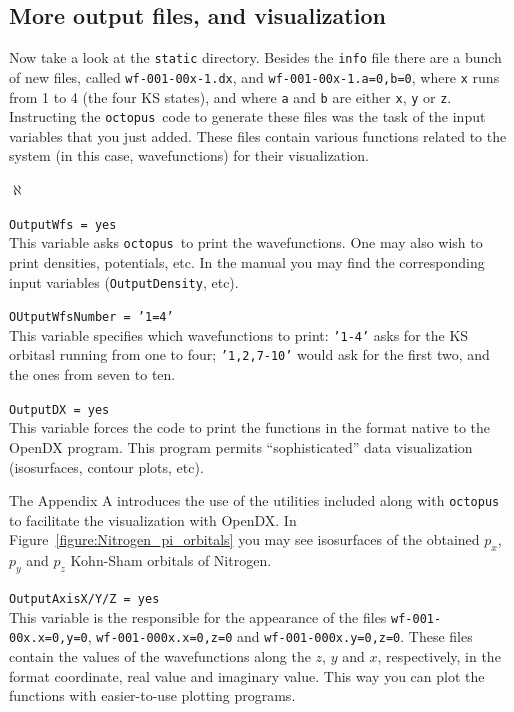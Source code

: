 \documentclass[10pt,a4paper,twoside]{article}
\newcommand{\octopus}{{\tt octopus}\ }
\newenvironment{mylist}
{
\begin{list}{$\aleph$}
{
\setlength{\parskip}{0pt}
\setlength{\topsep}{0pt}
\setlength{\partopsep}{0pt}
\setlength{\itemsep}{0pt}
\setlength{\parsep}{0pt}
}
}
{
\end{list}
}
\begin{document}
\subsection{More output files, and visualization}
Now take a look at the {\tt static} directory. Besides the {\tt info}
file there are a bunch of new files, called {\tt wf-001-00x-1.dx},
and {\tt wf-001-00x-1.a=0,b=0}, where {\tt x} runs from 1 to 4 (the four
KS states), and where {\tt a} and {\tt b} are either {\tt x}, {\tt y} or {\tt z}.
Instructing the \octopus code to generate these files
was the task of the input variables that you just added.
These files contain various functions related to the system (in this
case, wavefunctions) for their visualization.
\begin{mylist}
\item {\tt OutputWfs = yes}\\
This variable asks \octopus to print the wavefunctions. One may also wish
to print densities, potentials, etc. In the manual you may find the corresponding
input variables ({\tt OutputDensity}, etc).
\item {\tt OUtputWfsNumber = '1=4'}\\
This variable specifies which wavefunctions to print: {\tt '1-4'} asks
for the KS orbitasl running from one to four; {\tt '1,2,7-10'} would
ask for the first two, and the ones from seven to ten.
\item {\tt OutputDX = yes}\\
This variable forces the code to print the functions in the format
native to the OpenDX program. This program permits ``sophisticated'' data
visualization (isosurfaces, contour plots, etc).

The Appendix A introduces the use of the utilities included along with \octopus
to facilitate the visualization with OpenDX. In Figure~\ref{figure:Nitrogen_pi_orbitals}
you may see isosurfaces of the obtained $p_x$, $p_y$ and $p_z$ Kohn-Sham orbitals of Nitrogen.

\item {\tt OutputAxisX/Y/Z = yes}\\
This variable is the responsible for the appearance of the files {\tt wf-001-00x.x=0,y=0},
{\tt wf-001-000x.x=0,z=0} and {\tt wf-001-000x.y=0,z=0}. These files contain the values of
the wavefunctions along the $z$, $y$ and $x$, respectively, in the format
coordinate, real value and imaginary value. This way you can plot the functions
with easier-to-use plotting programs.

\end{mylist}
\end{document}
